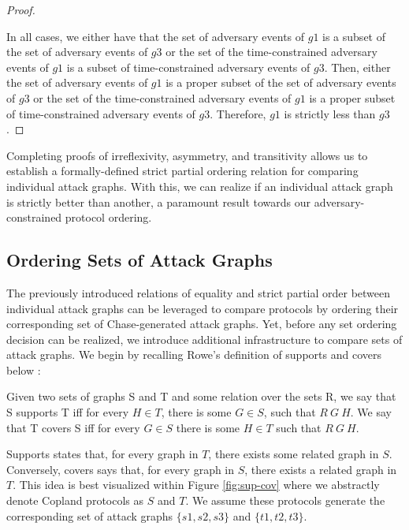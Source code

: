 \documentclass[runningheads]{llncs}
\theoremstyle{definition}
\begin{document}
\begin{proof}
\begin{enumerate}
    \end{enumerate}
   In all cases, we either have that the set of adversary events of $g1$ is a subset of the set of adversary events of $g3$ or the set of the time-constrained adversary events of $g1$ is a subset of time-constrained adversary events of $g3$. Then, either the set of adversary events of $g1$ is a proper subset of the set of adversary events of $g3$ or the set of the time-constrained adversary events of $g1$ is a proper subset of time-constrained adversary events of $g3$. Therefore, $g1$ is strictly less than $g3$. 
\end{proof}

Completing proofs of irreflexivity, asymmetry, and transitivity allows us to establish a formally-defined strict partial ordering relation for comparing individual attack graphs. With this, we can realize if an individual attack graph is strictly better than another, a paramount result towards our adversary-constrained protocol ordering.

\subsection*{Ordering Sets of Attack Graphs}

The previously introduced relations of equality and strict partial order between individual attack graphs can be leveraged to compare protocols by ordering their corresponding set of Chase-generated attack graphs. Yet, before any set ordering decision can be realized, we introduce additional infrastructure to compare sets of attack graphs. We begin by recalling Rowe's definition of supports and covers below \cite{Rowe:2021:OnOrdering}:

\begin{definition}
    Given two sets of graphs S and T and some relation over the sets R, we say that S supports T iff for every $H \in T$, there is some $G \in S$, such that $R\: G\: H$. We  say that T covers S iff for every $G \in S$ there is some $H \in T$ such that $R\: G\: H$.
\end{definition}

Supports states that, for every graph in $T$, there exists some related graph in $S$. Conversely, covers says that, for every graph in $S$, there exists a related graph in $T$.  This idea is best visualized within Figure \ref{fig:sup-cov} where we abstractly denote Copland protocols as $S$ and $T$. We assume these protocols generate the corresponding set of attack graphs $\{s1, s2 , s3 \}$ and $ \{t1, t2 ,t3\}$.
\end{document}
